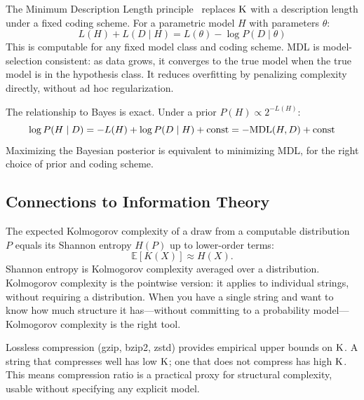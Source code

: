 The Minimum Description Length principle~\cite{rissanen1978} replaces $\mathrm{K}$
with a description length under a fixed coding scheme. For a parametric model
$H$ with parameters $\theta$:
\[
  L(H) + L(D \mid H) = L(\theta) - \log P(D \mid \theta)
\]
This is computable for any fixed model class and coding scheme. MDL is
model-selection consistent: as data grows, it converges to the true model
when the true model is in the hypothesis class. It reduces overfitting by
penalizing complexity directly, without ad hoc regularization.

The relationship to Bayes is exact. Under a prior $P(H) \propto 2^{-L(H)}$:
\[
  \log P(H \mid D) = -L(H) + \log P(D \mid H) + \text{const} = -\mathrm{MDL}(H,D) + \text{const}
\]
Maximizing the Bayesian posterior is equivalent to minimizing MDL, for the
right choice of prior and coding scheme.

\subsection{Connections to Information Theory}

The expected Kolmogorov complexity of a draw from a computable distribution
$P$ equals its Shannon entropy $H(P)$ up to lower-order terms:
\[
  \mathbb{E}[K(X)] \approx H(X).
\]
Shannon entropy is Kolmogorov complexity averaged over a distribution.
Kolmogorov complexity is the pointwise version: it applies to individual
strings, without requiring a distribution. When you have a single string and
want to know how much structure it has---without committing to a probability
model---Kolmogorov complexity is the right tool.

Lossless compression (gzip, bzip2, zstd) provides empirical upper bounds on
$\mathrm{K}$. A string that compresses well has low $\mathrm{K}$; one that does not compress
has high $\mathrm{K}$. This means compression ratio is a practical proxy for
structural complexity, usable without specifying any explicit model.